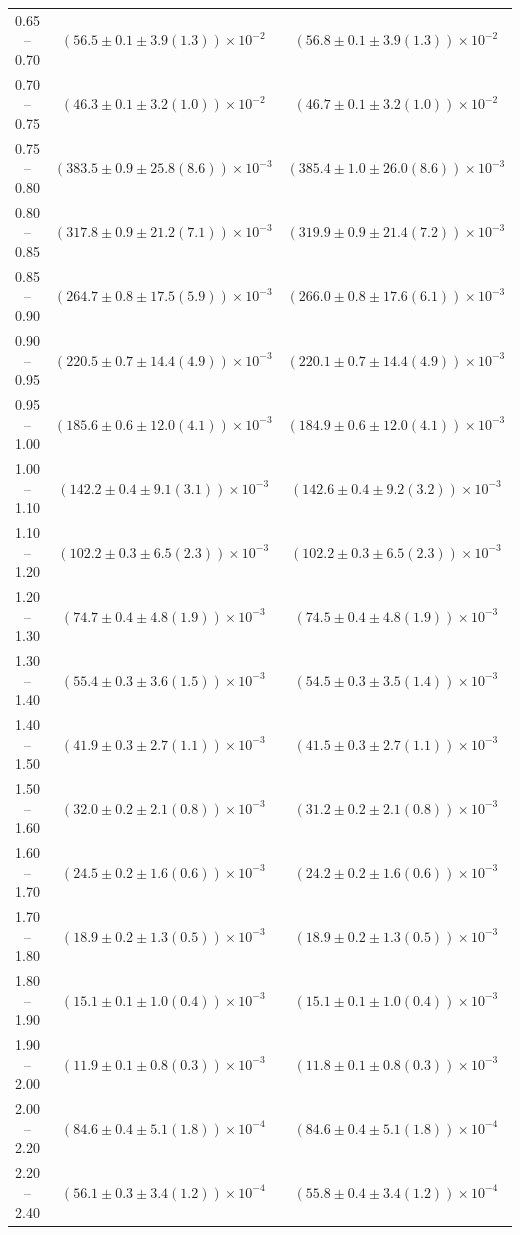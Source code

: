 \begin{table}
\begin{center}
\begin{tabular}{ c | c c }
0.65 -- 0.70 & $(56.5\pm0.1\pm3.9(1.3))\times10^{-2}$ & $(56.8\pm0.1\pm3.9(1.3))\times10^{-2}$ \\ 
0.70 -- 0.75 & $(46.3\pm0.1\pm3.2(1.0))\times10^{-2}$ & $(46.7\pm0.1\pm3.2(1.0))\times10^{-2}$ \\ 
0.75 -- 0.80 & $(383.5\pm0.9\pm25.8(8.6))\times10^{-3}$ & $(385.4\pm1.0\pm26.0(8.6))\times10^{-3}$ \\ 
0.80 -- 0.85 & $(317.8\pm0.9\pm21.2(7.1))\times10^{-3}$ & $(319.9\pm0.9\pm21.4(7.2))\times10^{-3}$ \\ 
0.85 -- 0.90 & $(264.7\pm0.8\pm17.5(5.9))\times10^{-3}$ & $(266.0\pm0.8\pm17.6(6.1))\times10^{-3}$ \\ 
0.90 -- 0.95 & $(220.5\pm0.7\pm14.4(4.9))\times10^{-3}$ & $(220.1\pm0.7\pm14.4(4.9))\times10^{-3}$ \\ 
0.95 -- 1.00 & $(185.6\pm0.6\pm12.0(4.1))\times10^{-3}$ & $(184.9\pm0.6\pm12.0(4.1))\times10^{-3}$ \\ 
1.00 -- 1.10 & $(142.2\pm0.4\pm9.1(3.1))\times10^{-3}$ & $(142.6\pm0.4\pm9.2(3.2))\times10^{-3}$ \\ 
1.10 -- 1.20 & $(102.2\pm0.3\pm6.5(2.3))\times10^{-3}$ & $(102.2\pm0.3\pm6.5(2.3))\times10^{-3}$ \\ 
1.20 -- 1.30 & $(74.7\pm0.4\pm4.8(1.9))\times10^{-3}$ & $(74.5\pm0.4\pm4.8(1.9))\times10^{-3}$ \\ 
1.30 -- 1.40 & $(55.4\pm0.3\pm3.6(1.5))\times10^{-3}$ & $(54.5\pm0.3\pm3.5(1.4))\times10^{-3}$ \\ 
1.40 -- 1.50 & $(41.9\pm0.3\pm2.7(1.1))\times10^{-3}$ & $(41.5\pm0.3\pm2.7(1.1))\times10^{-3}$ \\ 
1.50 -- 1.60 & $(32.0\pm0.2\pm2.1(0.8))\times10^{-3}$ & $(31.2\pm0.2\pm2.1(0.8))\times10^{-3}$ \\ 
1.60 -- 1.70 & $(24.5\pm0.2\pm1.6(0.6))\times10^{-3}$ & $(24.2\pm0.2\pm1.6(0.6))\times10^{-3}$ \\ 
1.70 -- 1.80 & $(18.9\pm0.2\pm1.3(0.5))\times10^{-3}$ & $(18.9\pm0.2\pm1.3(0.5))\times10^{-3}$ \\ 
1.80 -- 1.90 & $(15.1\pm0.1\pm1.0(0.4))\times10^{-3}$ & $(15.1\pm0.1\pm1.0(0.4))\times10^{-3}$ \\ 
1.90 -- 2.00 & $(11.9\pm0.1\pm0.8(0.3))\times10^{-3}$ & $(11.8\pm0.1\pm0.8(0.3))\times10^{-3}$ \\ 
2.00 -- 2.20 & $(84.6\pm0.4\pm5.1(1.8))\times10^{-4}$ & $(84.6\pm0.4\pm5.1(1.8))\times10^{-4}$ \\ 
2.20 -- 2.40 & $(56.1\pm0.3\pm3.4(1.2))\times10^{-4}$ & $(55.8\pm0.4\pm3.4(1.2))\times10^{-4}$ \\ 

\end{tabular}
\end{center}
\end{table}
